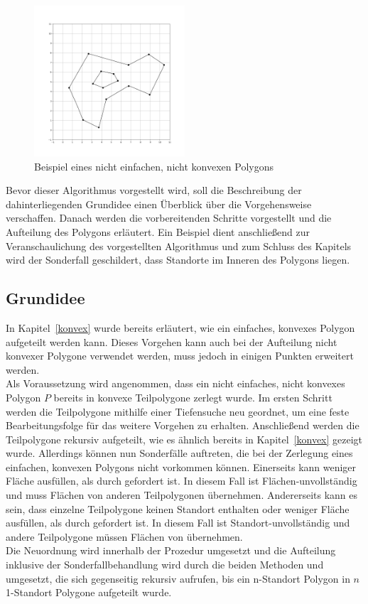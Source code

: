 \documentclass[ngerman]{seminarbeitrag}
\begin{document}
\begin{figure}[h]
    \includegraphics[width=0.50\textwidth]{./Abbildungen/4.png}
    \centering
    \caption{Beispiel eines nicht einfachen, nicht konvexen Polygons}
    \label{viertes beispiel}
\end{figure}
Bevor dieser Algorithmus vorgestellt wird, soll die Beschreibung der dahinterliegenden Grundidee einen Überblick über die Vorgehensweise verschaffen. Danach werden die vorbereitenden Schritte vorgestellt und die Aufteilung des Polygons erläutert. Ein Beispiel dient anschließend zur Veranschaulichung des vorgestellten Algorithmus und zum Schluss des Kapitels wird der Sonderfall geschildert, dass Standorte im Inneren des Polygons liegen.

\subsection{Grundidee}\label{grundidee nicht konvex}
In Kapitel~\ref{konvex} wurde bereits erläutert, wie ein einfaches, konvexes Polygon aufgeteilt werden kann. Dieses Vorgehen kann auch bei der Aufteilung nicht konvexer Polygone verwendet werden, muss jedoch in einigen Punkten erweitert werden.\\
Als Voraussetzung wird angenommen, dass ein nicht einfaches, nicht konvexes Polygon $P$ bereits in konvexe Teilpolygone \cpp zerlegt wurde. Im ersten Schritt werden die Teilpolygone mithilfe einer Tiefensuche neu geordnet, um eine feste Bearbeitungsfolge für das weitere Vorgehen zu erhalten. Anschließend werden die Teilpolygone rekursiv aufgeteilt, wie es ähnlich bereits in Kapitel~\ref{konvex} gezeigt wurde. Allerdings können nun Sonderfälle auftreten, die bei der Zerlegung eines einfachen, konvexen Polygons nicht vorkommen können. Einerseits kann \cpi weniger Fläche ausfüllen, als durch  gefordert ist. In diesem Fall ist \cpi Flächen-unvollständig und muss Flächen von anderen Teilpolygonen übernehmen. Andererseits kann es sein, dass einzelne Teilpolygone keinen Standort enthalten oder weniger Fläche ausfüllen, als durch  gefordert ist. In diesem Fall ist \cpi Standort-unvollständig und andere Teilpolygone müssen Flächen von \cpi übernehmen.\\
Die Neuordnung wird innerhalb der Prozedur \ord umgesetzt und die Aufteilung inklusive der Sonderfallbehandlung wird durch die beiden Methoden \noncon und \daa umgesetzt, die sich gegenseitig rekursiv aufrufen, bis ein n-Standort Polygon in $n$ 1-Standort Polygone aufgeteilt wurde.
\end{document}
